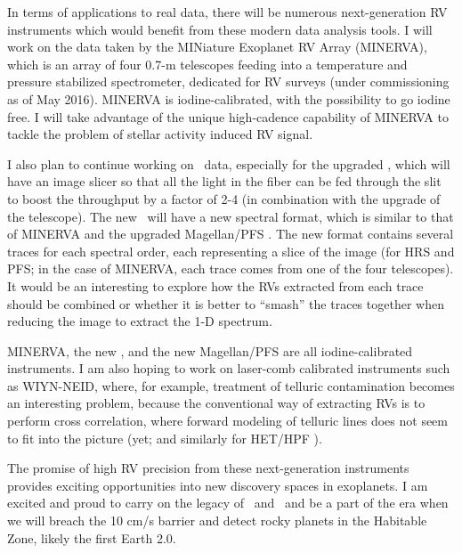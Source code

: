 In terms of applications to real data, there will be numerous
next-generation RV instruments which would benefit from these modern
data analysis tools. I will work on the data taken by the MINiature
Exoplanet RV Array (MINERVA), which is an array of four 0.7-m
telescopes feeding into a temperature and pressure stabilized
spectrometer, dedicated for RV surveys (under commissioning as of May
2016). MINERVA is iodine-calibrated, with the possibility to go iodine
free. I will take advantage of the unique high-cadence capability of
MINERVA to tackle the problem of stellar activity induced RV signal. 

I also plan to continue working on \het\ data, especially for the
upgraded \het, which will have an image slicer so that all the light
in the fiber can be fed through the slit to boost the throughput by a
factor of 2-4 (in combination with the upgrade of the telescope). The
new \het\ will have a new spectral format, which is similar to that of
MINERVA and the upgraded Magellan/PFS \citep{2010SPIE.7735E..53C}. The
new format contains several traces for each spectral order, each
representing a slice of the image (for HRS and PFS; in the case of
MINERVA, each trace comes from one of the four telescopes). It would
be an interesting to explore how the RVs extracted from each trace
should be combined or whether it is better to ``smash'' the traces
together when reducing the image to extract the 1-D spectrum.

MINERVA, the new \het, and the new Magellan/PFS are all
iodine-calibrated instruments. I am also hoping to work on laser-comb
calibrated instruments such as WIYN-NEID, where, for example,
treatment of telluric contamination becomes an interesting problem,
because the conventional way of extracting RVs is to perform cross
correlation, where forward modeling of telluric lines does not seem to
fit into the picture (yet; and similarly for HET/HPF
\citealt{2012SPIE.8446E..1SM}).   

The promise of high RV precision from these next-generation
instruments provides exciting opportunities into new discovery spaces
in exoplanets. I am excited and proud to carry on the legacy of \het\
and \keck\ and be a part of the era when we will breach the 10 cm/s
barrier and detect rocky planets in the Habitable Zone, likely the
first Earth 2.0.

